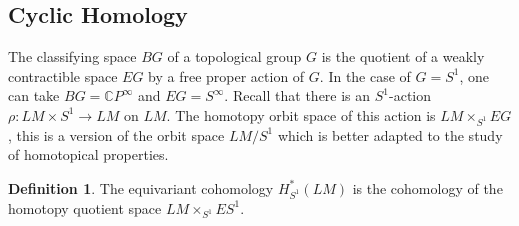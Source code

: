 \documentclass{scrartcl}
\theoremstyle{plain}
\theoremstyle{definition}
\newtheorem{definition}[theorem]{Definition}
\newcommand{\C}{\mathbb C}
\DeclareMathOperator{\cConf}{\overline{Conf}}
\begin{document}

%         
%         





\subsection{Cyclic Homology}

The classifying space $BG$ of a topological group $G$ is the quotient of a weakly contractible space $EG$ by a free proper action of $G$. In the case of $G=S^1$, one can take $BG = \C P^\infty$ and $EG = S^\infty$. Recall that there is an $S^1$-action $\rho\colon LM\times S^1\to LM$ on $LM$. The homotopy orbit space of this action is $LM\times_{S^1} EG$, this is a version of the orbit space $LM/S^1$ which is better adapted to the study of homotopical properties. 
\begin{definition}
The equivariant cohomology $H_{S^1}^*(LM)$ is the cohomology of the homotopy quotient space $LM\times_{S^1} ES^1$.
\end{definition}
\end{document}
